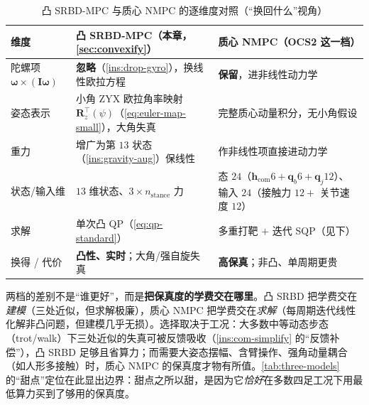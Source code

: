 \begin{table}[H]\centering\small
\caption{凸 SRBD-MPC 与质心 NMPC 的逐维度对照（“换回什么”视角）}
\begin{tabular}{p{} p{} p{}}
\toprule
维度 & 凸 SRBD-MPC（本章，\cref{sec:convexify}） & 质心 NMPC（OCS2 这一档） \\
\midrule
陀螺项 $\boldsymbol{\omega}\!\times\!(\mathbf{I}\boldsymbol{\omega})$ & \textbf{忽略}（\cref{ins:drop-gyro}），换线性欧拉方程 & \textbf{保留}，进非线性动力学 \\
姿态表示 & 小角 ZYX 欧拉角率映射 $\mathbf{R}_z^\top(\psi)$（\cref{eq:euler-map-small}），大角失真 & 完整质心动量积分，无小角假设 \\
重力 & 增广为第 $13$ 状态（\cref{ins:gravity-aug}）保线性 & 作非线性项直接进动力学 \\
状态/输入维 & $13$ 维状态、$3\!\times\!n_{\text{stance}}$ 力 & 态 $24$（$\mathbf{h}_{\text{com}}6+\mathbf{q}_b6+\mathbf{q}_j12$）、输入 $24$（接触力 $12+$ 关节速度 $12$）\\
求解 & 单次凸 QP（\cref{eq:qp-standard}） & 多重打靶 $+$ 迭代 SQP（见下） \\
换得 / 代价 & \textbf{凸性、实时}；大角/强自旋失真 & \textbf{高保真}；非凸、单周期更贵 \\
\bottomrule
\end{tabular}
\label{tab:srbd-vs-nmpc}
\end{table}

\begin{insight}\label{ins:mpc-nmpc-compare}
两档的差别不是“谁更好”，而是\textbf{把保真度的学费交在哪里}。凸 SRBD 把学费交在\emph{建模}（三处近似，但求解极廉），质心 NMPC 把学费交在\emph{求解}（每周期迭代线性化解非凸问题，但建模几乎无损）。选择取决于工况：大多数中等动态步态（trot/walk）下三处近似的失真可被反馈吸收（\cref{ins:com-simplify} 的“反馈补偿”），凸 SRBD 足够且省算力；而需要大姿态摆幅、含臂操作、强角动量耦合（如人形多接触）时，质心 NMPC 的保真度才物有所值。\cref{tab:three-models} 的“甜点”定位在此显出边界：甜点之所以甜，是因为它\emph{恰好}在多数四足工况下用最低算力买到了够用的保真度。
\end{insight}

